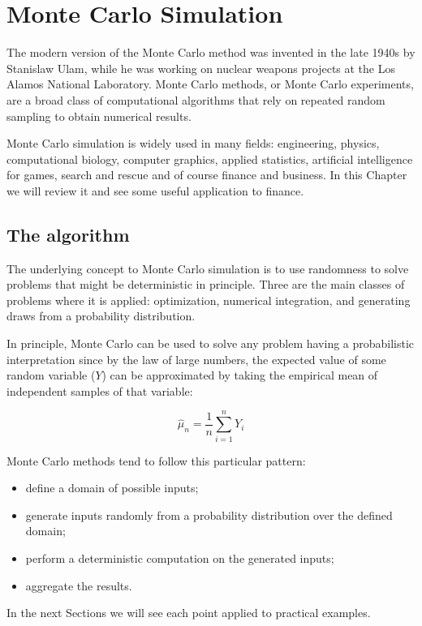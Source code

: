 \chapter{Monte Carlo Simulation}\label{cap:montecarlo}

The modern version of the Monte Carlo method was invented in the late
1940s by Stanislaw Ulam, while he was working on nuclear weapons
projects at the Los Alamos National Laboratory.
Monte Carlo methods, or Monte Carlo experiments, are a broad class of
computational algorithms that rely on repeated random sampling to obtain
numerical results. 

Monte Carlo simulation is widely used in many fields: engineering,
physics, computational biology, computer graphics, applied statistics,
artificial intelligence for games, search and rescue and of course
finance and business.
In this Chapter we will review it and see some useful application to finance.

\section{The algorithm}\label{whats-monte-carlo-simulation}

The underlying concept to Monte Carlo simulation is to use randomness to solve
problems that might be deterministic in principle. Three are the main classes
of problems where it is applied: optimization, numerical
integration, and generating draws from a probability distribution.

In principle, Monte Carlo can be used to solve any problem
having a probabilistic interpretation since by the law of large numbers, the
expected value of some random variable ($Y$) can be approximated by taking the
empirical mean of independent samples of that variable:

\[ \hat{\mu}_n = \frac{1}{n}\sum_{i=1}^{n}{Y_i} \]

Monte Carlo methods tend to follow this particular pattern:
\begin{itemize}
\tightlist
\item
  define a domain of possible inputs;
\item
  generate inputs randomly from a probability distribution over the
  defined domain;
\item
  perform a deterministic computation on the generated inputs;
\item
  aggregate the results.
\end{itemize}
In the next Sections we will see each point applied to practical examples.

